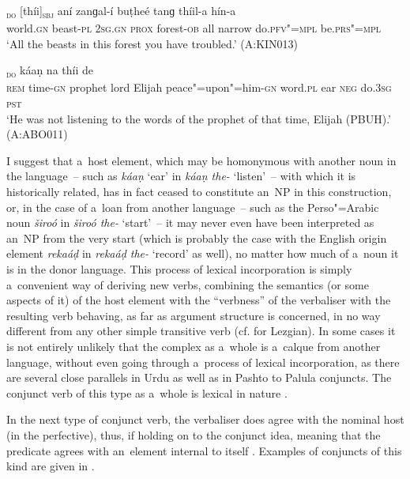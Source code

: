 \begin{exe}
\ex
\label{ex:12-75}
\textsubscript{\textsc{do}} [thíi]\textsubscript{\textsc{sbj}} aní zanɡal-í buṭheé tanɡ thíil-a hín-a \\
world.\textsc{gn} beast-\textsc{pl} \textsc{2sg.gn} \textsc{prox} forest-\textsc{ob} all  narrow do.\textsc{pfv"=mpl} be.\textsc{prs"=mpl} \\
\glt `All the beasts in this forest you have troubled.' (A:KIN013)

\ex
\label{ex:12-76}
\gll [eesé waxt-íi peeɣambár hazrát ilyaás aleehi"=salaam-íi beetí]\textsubscript{\textsc{do}} káaṇ na thíi de \\
\textsc{rem} time-\textsc{gn} prophet lord Elijah peace"=upon"=him-\textsc{gn} word.\textsc{pl} ear \textsc{neg} do.\textsc{3sg} \textsc{pst} \\
\glt `He was not listening to the words of the prophet of that time, Elijah (PBUH).' (A:ABO011)
\end{exe}

I suggest that a~host element, which may be homonymous with another noun in the language~-- such as \textit{káaṇ} `ear' in \textit{káaṇ the-} `listen'~-- with which it is historically related, has in fact ceased to constitute an~NP in this construction, or, in the case of a~loan from another language~-- such as the Perso"=Arabic noun \textit{široó} in \textit{široó the-} `start'~-- it may never even have been interpreted as an~NP from the very start (which is probably the case with the English origin element \textit{rekaáḍ} in \textit{rekaáḍ the-} `record' as well), no matter how much of a~noun it is in the donor language. This process of lexical incorporation \citep[203]{verma1993} is simply a~convenient way of deriving new verbs, combining the semantics (or some aspects of it) of the host element with the ``verbness'' of the verbaliser with the resulting verb behaving, as far as argument structure is concerned, in no way different from any other simple transitive verb (cf. \citealt[286]{haspelmath1993} for Lezgian). In some cases it is not entirely unlikely that the complex as a~whole is a~calque from another language, without even going through a~process of lexical incorporation, as there are several close parallels in Urdu as well as in Pashto to Palula conjuncts. The conjunct verb of this type as a~whole is lexical in nature \citep[199]{verma1993}.



 In the next type of conjunct verb, the verbaliser does agree with the nominal host (in the perfective), thus, if holding on to the conjunct idea, meaning that the predicate agrees with an~element internal to itself \citep[168]{mohanan1993}. Examples of conjuncts of this kind are given in .


